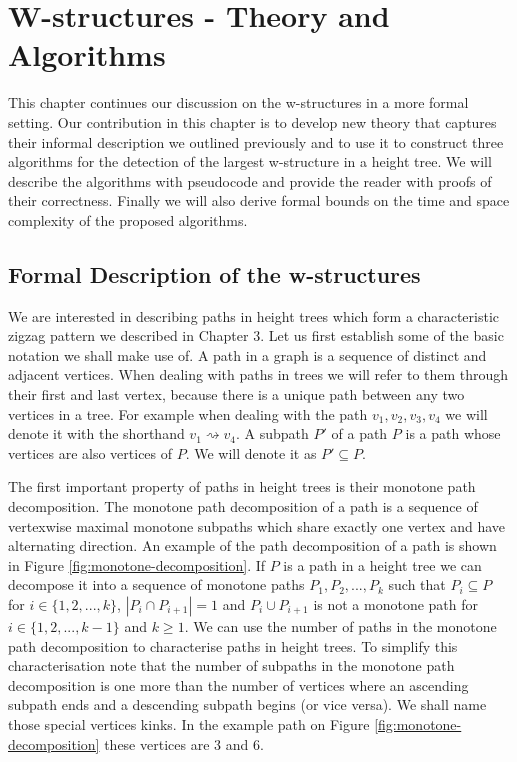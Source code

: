 \chapter{W-structures - Theory and Algorithms}
\label{chapter4}

This chapter continues our discussion on the w-structures in a more formal setting. Our contribution in this chapter is to develop new theory that captures their informal description we outlined previously and to use it to construct three algorithms for the detection of the largest w-structure in a height tree. We will describe the algorithms with pseudocode and provide the reader with proofs of their correctness. Finally we will also derive formal bounds on the time and space complexity of the proposed algorithms.

\section{Formal Description of the w-structures}

We are interested in describing paths in height trees which form a characteristic zigzag pattern we described in Chapter 3. Let us first establish some of the basic notation we shall make use of. A path in a graph is a sequence of distinct and adjacent vertices. When dealing with paths in trees we will refer to them through their first and last vertex, because there is a unique path between any two vertices in a tree. For example when dealing with the path $v_1, v_2, v_3, v_4$ we will denote it with the shorthand $v_1 \rightsquigarrow v_4$. A subpath $P'$ of a path $P$ is a path whose vertices are also vertices of $P$. We will denote it as $P' \subseteq P$.

The first important property of paths in height trees is their monotone path decomposition. The monotone path decomposition of a path is a sequence of vertexwise maximal monotone subpaths which share exactly one vertex and have alternating direction. An example of the path decomposition of a path is shown in Figure \ref{fig:monotone-decomposition}.
If $P$ is a path in a height tree we can decompose it into a sequence of monotone paths $P_1, P_2, ..., P_k$ such that $P_i \subseteq P$ for $i \in \{1, 2, ..., k\}$, $|P_i \cap P_{i+1}| = 1$ and $P_i \cup P_{i+1}$ is not a monotone path for $i \in \{1, 2, ..., k-1\}$ and $k \ge 1$. We can use the number of paths in the monotone path decomposition to characterise paths in height trees. To simplify this characterisation note that the number of subpaths in the monotone path decomposition is one more than the number of vertices where an ascending subpath ends and a descending subpath begins (or vice versa). We shall name those special vertices kinks. In the example path on Figure \ref{fig:monotone-decomposition} these vertices are $3$ and $6$.

